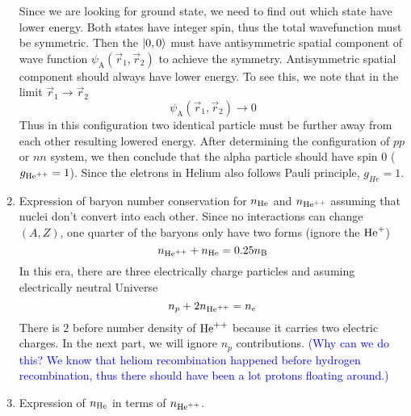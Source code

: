 \begin{enumerate}[label=(\alph*)]
      Since we are looking for ground state, we need to find out which state have lower energy. Both states have integer spin, thus the total wavefunction must be symmetric. Then the $\ket{0, 0}$ must have antisymmetric spatial component of wave function $\psi_\text{A}(\vec{r}_1, \vec{r}_2)$ to achieve the symmetry. Antisymmetric spatial component should always have lower energy. To see this, we note that in the limit $\vec{r}_1 \rightarrow \vec{r}_2$
      \begin{equation*}
         \psi_\text{A}(\vec{r}_1, \vec{r}_2) \rightarrow 0
      \end{equation*}
      Thus in this configuration two identical particle must be further away from each other resulting lowered energy. After determining the configuration of $pp$ or $nn$ system, we then conclude that the alpha particle should have spin $0$ ($g_{\text{He}^{++}} = 1$). Since the eletrons in Helium also follows Pauli principle, $g_{He} = 1$.

   \item Expression of baryon number conservation for $n_{\text{He}}$ and $n_{\text{He}^{++}}$ assuming that nuclei don't convert into each other. Since no interactions can change $(A,Z)$, one quarter of the baryons only have two forms (ignore the $\text{He}^+$)
      \begin{equation}
         n_{\text{He}^{++}} + n_{\text{He}} = 0.25 n_\text{B} \label{math:bcons}
      \end{equation}
      In this era, there are three electrically charge particles and asuming electrically neutral Universe
      \begin{equation}
         n_p + 2 n_{{\text{He}^{++}}} = n_e \label{math:neutral}
      \end{equation}
      There is $2$ before number density of ${\text{He}^{++}}$ because it carries two electric charges. In the next part, we will ignore $n_p$ contributions. \textcolor{blue}{(Why can we do this? We know that heliom recombination happened before hydrogen recombination, thus there should have been a lot protons floating around.)}
   \item Expression of $n_{\text{He}}$ in terms of $n_{{\text{He}^{++}}}$. 


\end{enumerate}
